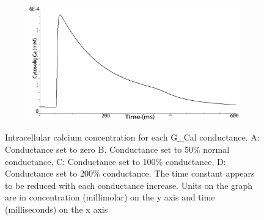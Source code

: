 \documentclass[11pt]{article}
\begin{document}
\begin{figure}[H]
\begin{subfigure}{0.45\textwidth}
		\caption{}
		\label{fig:left}
	\end{subfigure}
	\begin{subfigure}{0.45\textwidth}
		\centering
		\includegraphics[width = \textwidth]{figs/200gcaledit.png}
		\caption{}
		\label{fig:right}
	\end{subfigure}
	\caption{Intracellular calcium concentration for each G\_Cal conductance. A: Conductance set to zero B. Conductance set to 50\% normal conductance, C: Conductance set to 100\% conductance, D: Conductance set to 200\% conductance. The time constant appears to be reduced with each conductance increase. Units on the graph are in concentration (millimolar) on the y axis and time (milliseconds) on the x axis}
	\label{fig:exp2}
\end{figure}
\end{document}
